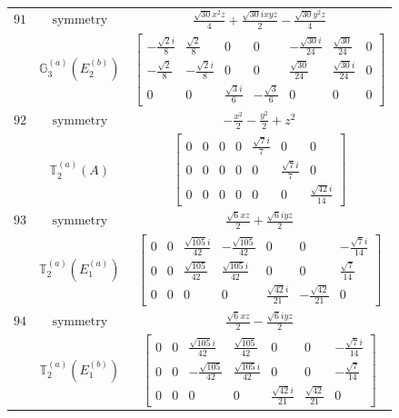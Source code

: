 \documentclass[fleqn,8pt,landscape]{jsarticle}
\begin{document}
\begin{longtable}{ccc}
$ 91 $ & $ \text{symmetry} $ & $ \frac{\sqrt{30} x^{2} z}{4} + \frac{\sqrt{30} i x y z}{2} - \frac{\sqrt{30} y^{2} z}{4} $ \\
$  $ & $ \mathbb{G}_{3}^{(a)}(E_{2}^{(b)}) $ & $ \begin{bmatrix} - \frac{\sqrt{2} i}{8} & \frac{\sqrt{2}}{8} & 0 & 0 & - \frac{\sqrt{30} i}{24} & \frac{\sqrt{30}}{24} & 0 \\ - \frac{\sqrt{2}}{8} & - \frac{\sqrt{2} i}{8} & 0 & 0 & \frac{\sqrt{30}}{24} & \frac{\sqrt{30} i}{24} & 0 \\ 0 & 0 & \frac{\sqrt{3} i}{6} & - \frac{\sqrt{3}}{6} & 0 & 0 & 0 \end{bmatrix} $ \\ \hline
$ 92 $ & $ \text{symmetry} $ & $ - \frac{x^{2}}{2} - \frac{y^{2}}{2} + z^{2} $ \\
$  $ & $ \mathbb{T}_{2}^{(a)}(A) $ & $ \begin{bmatrix} 0 & 0 & 0 & 0 & \frac{\sqrt{7} i}{7} & 0 & 0 \\ 0 & 0 & 0 & 0 & 0 & \frac{\sqrt{7} i}{7} & 0 \\ 0 & 0 & 0 & 0 & 0 & 0 & \frac{\sqrt{42} i}{14} \end{bmatrix} $ \\ \hline
$ 93 $ & $ \text{symmetry} $ & $ \frac{\sqrt{6} x z}{2} + \frac{\sqrt{6} i y z}{2} $ \\
$  $ & $ \mathbb{T}_{2}^{(a)}(E_{1}^{(a)}) $ & $ \begin{bmatrix} 0 & 0 & \frac{\sqrt{105} i}{42} & - \frac{\sqrt{105}}{42} & 0 & 0 & - \frac{\sqrt{7} i}{14} \\ 0 & 0 & \frac{\sqrt{105}}{42} & \frac{\sqrt{105} i}{42} & 0 & 0 & \frac{\sqrt{7}}{14} \\ 0 & 0 & 0 & 0 & \frac{\sqrt{42} i}{21} & - \frac{\sqrt{42}}{21} & 0 \end{bmatrix} $ \\ \hline
$ 94 $ & $ \text{symmetry} $ & $ \frac{\sqrt{6} x z}{2} - \frac{\sqrt{6} i y z}{2} $ \\
$  $ & $ \mathbb{T}_{2}^{(a)}(E_{1}^{(b)}) $ & $ \begin{bmatrix} 0 & 0 & \frac{\sqrt{105} i}{42} & \frac{\sqrt{105}}{42} & 0 & 0 & - \frac{\sqrt{7} i}{14} \\ 0 & 0 & - \frac{\sqrt{105}}{42} & \frac{\sqrt{105} i}{42} & 0 & 0 & - \frac{\sqrt{7}}{14} \\ 0 & 0 & 0 & 0 & \frac{\sqrt{42} i}{21} & \frac{\sqrt{42}}{21} & 0 \end{bmatrix} $ \\ \hline

\end{longtable}
\end{document}
